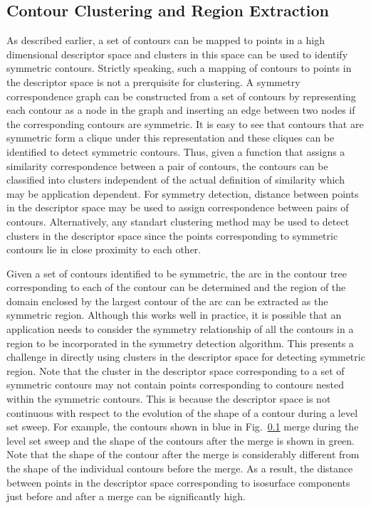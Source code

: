 \documentclass[review,journal]{vgtc}         %
\begin{document}
\subsection{Contour Clustering and Region Extraction}
As described earlier, a set of contours can be mapped to points in a high
dimensional descriptor space and clusters in this space can be used to identify
symmetric contours. Strictly speaking, such a mapping of contours to points in the
descriptor space is not a prerquisite for clustering. A symmetry correspondence
graph can be constructed from a set of contours by representing each contour
as a node in the graph and inserting an edge between two nodes if the corresponding
contours are symmetric. It is easy to see that contours that are symmetric form
a clique under this representation and these cliques can be identified to detect
symmetric contours. Thus, given a function that assigns a similarity correspondence
between a pair of contours, the contours can be classified into clusters independent
of the actual definition of similarity which may be application dependent. For symmetry
detection, distance between points in the descriptor space may be used to assign
correspondence between pairs of contours. Alternatively, any standart clustering
method may be used to detect clusters in the descriptor space since the points 
corresponding to symmetric contours lie in close proximity to each other.

Given a set of contours identified to be symmetric, the arc in the contour tree 
corresponding to each of the contour can be determined and the region of the domain
enclosed by the largest contour of the arc can be extracted as the symmetric region.
Although this works well in practice, it is possible that an application needs to
consider the symmetry relationship of all the contours in a region to be incorporated 
in the symmetry detection algorithm. This presents a challenge in directly using 
clusters in the descriptor space for detecting symmetric region. Note  that the 
cluster in the descriptor space corresponding to a set of symmetric contours may 
not contain points corresponding to contours nested within the symmetric contours. 
This is because the descriptor space is not continuous with respect to the evolution 
of the shape of a contour during a level set sweep. For example, the contours shown in
blue in Fig.~\ref{} merge during the level set sweep and the shape of the contours 
after the merge is shown in green. Note that the shape of the contour after the merge 
is considerably different from the shape of the individual contours before the merge. 
As a result, the distance between points in the descriptor space corresponding to 
isosurface components just before and after a merge can be significantly high.
\end{document}
